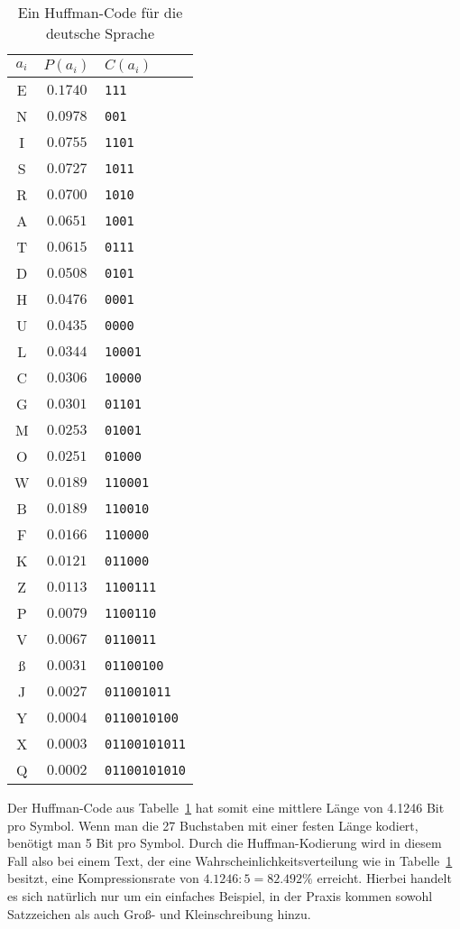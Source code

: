 \documentclass[twoside,11pt,a4paper]{article}
\theoremstyle{break}
\begin{document}
\begin{table}[h]
\centering
\caption{Ein Huffman-Code für die deutsche Sprache}
\begin{tabular}{c|c|l}
$a_i$ & $P(a_i)$ & $C(a_i)$ \\ \hline
E & $0.1740$ & {\tt111} \\
N & $0.0978$ & {\tt001} \\
I & $0.0755$ & {\tt1101} \\
S & $0.0727$ & {\tt1011} \\
R & $0.0700$ & {\tt1010} \\
A & $0.0651$ & {\tt1001} \\
T & $0.0615$ & {\tt0111} \\
D & $0.0508$ & {\tt0101} \\
H & $0.0476$ & {\tt0001} \\
U & $0.0435$ & {\tt0000} \\
L & $0.0344$ & {\tt10001} \\
C & $0.0306$ & {\tt10000} \\
G & $0.0301$ & {\tt01101} \\
M & $0.0253$ & {\tt01001} \\
O & $0.0251$ & {\tt01000} \\
W & $0.0189$ & {\tt110001} \\
B & $0.0189$ & {\tt110010} \\
F & $0.0166$ & {\tt110000} \\
K & $0.0121$ & {\tt011000} \\
Z & $0.0113$ & {\tt1100111} \\
P & $0.0079$ & {\tt1100110} \\
V & $0.0067$ & {\tt0110011} \\
ß & $0.0031$ & {\tt01100100} \\
J & $0.0027$ & {\tt011001011} \\
Y & $0.0004$ & {\tt0110010100} \\
X & $0.0003$ & {\tt01100101011} \\
Q & $0.0002$ & {\tt01100101010}
\end{tabular}
\label{tab:HGER}
\end{table}

Der Huffman-Code aus Tabelle~\ref{tab:HGER} hat somit eine mittlere
Länge von 4.1246 Bit pro Symbol. Wenn man die 27 Buchstaben mit einer
festen Länge kodiert, benötigt man 5 Bit pro Symbol. Durch die
Huffman-Kodierung wird in diesem Fall also bei einem Text, der eine
Wahrscheinlichkeitsverteilung wie in Tabelle~\ref{tab:HGER} besitzt,
eine Kompressionsrate von $4.1246 : 5 = 82.492 \%$ erreicht. Hierbei
handelt es sich natürlich nur um ein einfaches Beispiel, in der Praxis
kommen sowohl Satzzeichen als auch Groß- und Kleinschreibung hinzu.
\end{document}
